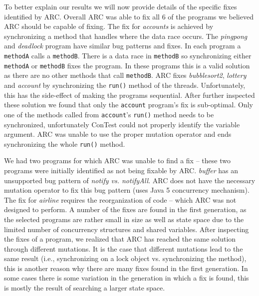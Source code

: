 
To better explain our results we will now provide details of the specific fixes identified by ARC. Overall ARC was able to fix all 6 of the programs we believed ARC should be capable of fixing. The fix for \textit{accounts} is achieved by synchronizing a method that handles where the data race occurs.  The \textit{pingpong} and \textit{deadlock} program have similar bug patterns and fixes.  In each program a \texttt{methodA} calls a \texttt{methodB}.  There is a data race in \texttt{methodB} so synchronizing either \texttt{methodA} or \texttt{methodB} fixes the program.  In these programs this is a valid solution as there are no other methods that call \texttt{methodB}.  ARC fixes \textit{bubblesort2}, \textit{lottery} and \textit{account} by synchronizing the \texttt{run()} method of the threads.  Unfortunately, this has the side-effect of making the programs sequential.  After further inspected these solution we found that only the \texttt{account} program's fix is sub-optimal.  Only one of the methods called from \texttt{account}'s  \texttt{run()} method  needs to be synchronized, unfortunately ConTest could not properly identify the variable argument. ARC was unable to use the proper mutation operator and ends synchronizing the whole \texttt{run()} method.

We had two programs for which ARC was unable to find a fix -- these two programs were initially identified as not being fixable by ARC. \textit{buffer} has an unsupported bug pattern of \textit{notify vs. notifyAll}. ARC does not have the necessary mutation operator to fix this bug pattern (uses Java 5 concurrency mechanism). The fix for \textit{airline} requires the reorganization of code -- which ARC was not designed to perform.  A number of the fixes are found in the first generation, as the selected programs are rather small in size as well as state space due to the limited number of concurrency structures and shared variables.  After inspecting the fixes of a program, we realized that ARC has reached the same solution through different mutations. It is the case that different mutations lead to the same result (i.e., synchronizing on a lock object vs. synchronizing the method), this is another reason why there are many fixes found in the first generation.  In  some cases there is some variation in the generation in which a fix is found, this is mostly the result of searching a larger state space.
